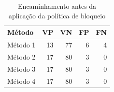 \begin{table}[htbp]
\centering
\small
\caption{Encaminhamento antes da aplicação da política de bloqueio}
\label{tab:handoff_inicial}
\begin{tabular}{lrrrr}
\hline
Método & VP & VN & FP & FN \\
\hline
Método 1 & 13 & 77 & 6 & 4 \\
Método 2 & 17 & 80 & 3 & 0 \\
Método 3 & 17 & 80 & 3 & 0 \\
Método 4 & 17 & 80 & 3 & 0 \\
\hline
\end{tabular}
\end{table}

